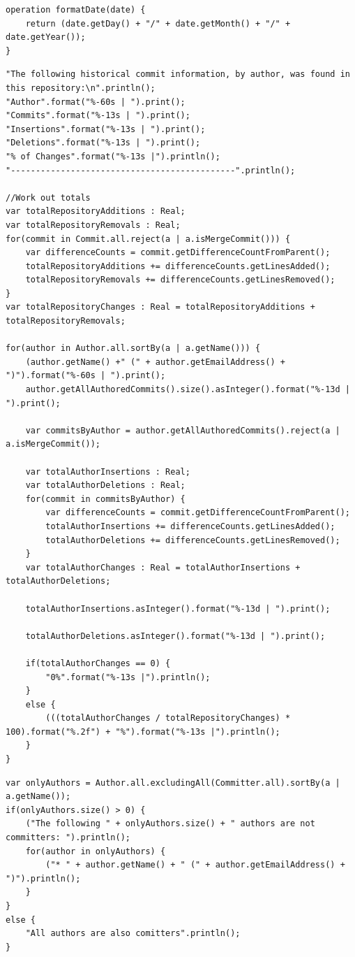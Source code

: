 \documentclass[11pt]{book}
\begin{document}
\begin{appendices}
\begin{lstlisting}[caption=Commit frequency, label=lst:commitfrequency]
operation formatDate(date) {
	return (date.getDay() + "/" + date.getMonth() + "/" + date.getYear());
}
\end{lstlisting}

\begin{lstlisting}[caption=GitInspector-style output, label=lst:gitinspectorequivilence]
"The following historical commit information, by author, was found in this repository:\n".println();
"Author".format("%-60s | ").print();
"Commits".format("%-13s | ").print();
"Insertions".format("%-13s | ").print();
"Deletions".format("%-13s | ").print();
"% of Changes".format("%-13s |").println();
"---------------------------------------------".println();

//Work out totals
var totalRepositoryAdditions : Real;
var totalRepositoryRemovals : Real;
for(commit in Commit.all.reject(a | a.isMergeCommit())) {
	var differenceCounts = commit.getDifferenceCountFromParent();
	totalRepositoryAdditions += differenceCounts.getLinesAdded();
	totalRepositoryRemovals += differenceCounts.getLinesRemoved();
}
var totalRepositoryChanges : Real = totalRepositoryAdditions + totalRepositoryRemovals;
	
for(author in Author.all.sortBy(a | a.getName())) {
	(author.getName() +" (" + author.getEmailAddress() + ")").format("%-60s | ").print();	
	author.getAllAuthoredCommits().size().asInteger().format("%-13d | ").print();
	
	var commitsByAuthor = author.getAllAuthoredCommits().reject(a | a.isMergeCommit());
		
	var totalAuthorInsertions : Real;
	var totalAuthorDeletions : Real;
	for(commit in commitsByAuthor) {
		var differenceCounts = commit.getDifferenceCountFromParent();
		totalAuthorInsertions += differenceCounts.getLinesAdded();
		totalAuthorDeletions += differenceCounts.getLinesRemoved();
	}
	var totalAuthorChanges : Real = totalAuthorInsertions + totalAuthorDeletions;
	
	totalAuthorInsertions.asInteger().format("%-13d | ").print();
	
	totalAuthorDeletions.asInteger().format("%-13d | ").print();
	
	if(totalAuthorChanges == 0) {
		"0%".format("%-13s |").println();
	}
	else {
		(((totalAuthorChanges / totalRepositoryChanges) * 100).format("%.2f") + "%").format("%-13s |").println();
	}
}
\end{lstlisting}

\begin{lstlisting}[caption=Author vs Committer Information, label=lst:authorvscommitter]
var onlyAuthors = Author.all.excludingAll(Committer.all).sortBy(a | a.getName());
if(onlyAuthors.size() > 0) {
	("The following " + onlyAuthors.size() + " authors are not committers: ").println();
	for(author in onlyAuthors) {
		("* " + author.getName() + " (" + author.getEmailAddress() + ")").println();
	} 
}
else {
	"All authors are also comitters".println();
}


\end{lstlisting}
\end{appendices}
\end{document}
